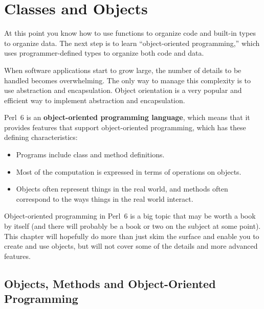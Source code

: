 \chapter{Classes and Objects}
\label{objects}


At this point you know how to use functions to organize code and 
built-in types to organize data.  The next step is to learn
``object-oriented programming,'' which uses programmer-defined types
to organize both code and data.

When software applications start to grow large, the number of 
details to be handled becomes overwhelming. The only 
way to manage this complexity is to use abstraction and 
encapsulation. Object orientation is a very popular and efficient 
way to implement abstraction and encapsulation.

Perl~6 is an {\bf object-oriented programming language}, which means
that it provides features that support object-oriented
programming, which has these defining characteristics:

\begin{itemize}

\item Programs include class and method definitions.

\item Most of the computation is expressed in terms of operations on
  objects.

\item Objects often represent things in the real world, and methods 
often correspond to the ways things in the real world interact.

\end{itemize}


Object-oriented programming in 
Perl~6 is a big topic that may be worth a book by itself (and 
there will probably be a book or two on the subject at some point). 
This chapter will hopefully do more than just skim the surface 
and enable you to create and use objects, but will not 
cover some of the details and more advanced features.

\section{Objects, Methods and Object-Oriented Programming}

